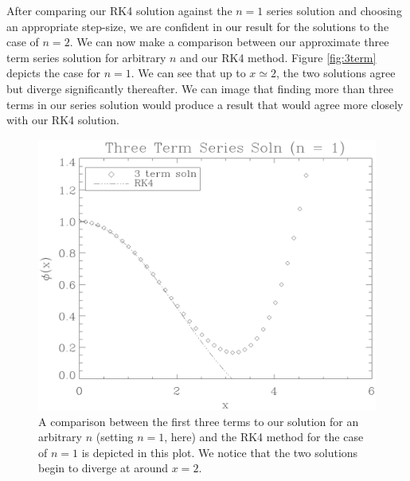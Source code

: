 \documentclass[12pt, manuscript]{article}
\begin{document}
After comparing our RK4 solution against the $n = 1$ series solution and choosing an appropriate step-size, we are confident in our result for the solutions to the case of $n = 2$. We can now make a comparison between our approximate three term series solution for arbitrary $n$ and our RK4 method. Figure \eqref{fig:3term} depicts the case for $n = 1$. We can see that up to $x \simeq 2$, the two solutions agree but diverge significantly thereafter. We can image that finding more than three terms in our series solution would produce a result that would agree more closely with our RK4 solution.
\begin{figure}[H]
    \begin{center}
        \includegraphics[scale=0.6]{images/3term_n1.eps}
        \caption{A comparison between the first three terms to our solution for an arbitrary $n$ (setting $n = 1$, here) and the RK4 method for the case of $n = 1$ is depicted in this plot. We notice that the two solutions begin to diverge at around $x = 2$.}\label{fig:3term}
    \end{center}
\end{figure}
\end{document}
